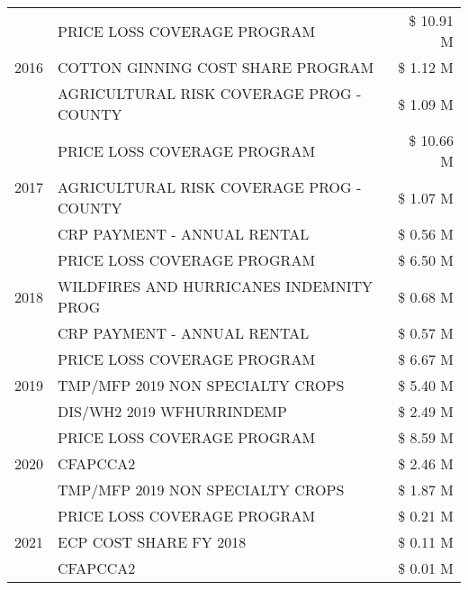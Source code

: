 \begin{tabular}{llr}
\cline{1-3}
\multirow[t]{3}{*}{2016} & PRICE LOSS COVERAGE PROGRAM                   & \$ 10.91 M \\
 & COTTON GINNING COST SHARE PROGRAM             & \$ 1.12 M \\
 & AGRICULTURAL RISK COVERAGE PROG - COUNTY      & \$ 1.09 M \\
\cline{1-3}
\multirow[t]{3}{*}{2017} & PRICE LOSS COVERAGE PROGRAM & \$ 10.66 M \\
 & AGRICULTURAL RISK COVERAGE PROG - COUNTY & \$ 1.07 M \\
 & CRP PAYMENT - ANNUAL RENTAL & \$ 0.56 M \\
\cline{1-3}
\multirow[t]{3}{*}{2018} & PRICE LOSS COVERAGE PROGRAM & \$ 6.50 M \\
 & WILDFIRES AND HURRICANES INDEMNITY PROG & \$ 0.68 M \\
 & CRP PAYMENT - ANNUAL RENTAL & \$ 0.57 M \\
\cline{1-3}
\multirow[t]{3}{*}{2019} & PRICE LOSS COVERAGE PROGRAM & \$ 6.67 M \\
 & TMP/MFP 2019 NON SPECIALTY CROPS & \$ 5.40 M \\
 & DIS/WH2 2019 WFHURRINDEMP & \$ 2.49 M \\
\cline{1-3}
\multirow[t]{3}{*}{2020} & PRICE LOSS COVERAGE PROGRAM & \$ 8.59 M \\
 & CFAPCCA2 & \$ 2.46 M \\
 & TMP/MFP 2019 NON SPECIALTY CROPS & \$ 1.87 M \\
\cline{1-3}
\multirow[t]{3}{*}{2021} & PRICE LOSS COVERAGE PROGRAM & \$ 0.21 M \\
 & ECP COST SHARE FY 2018 & \$ 0.11 M \\
 & CFAPCCA2 & \$ 0.01 M \\
\cline{1-3}
\bottomrule
\end{tabular}
